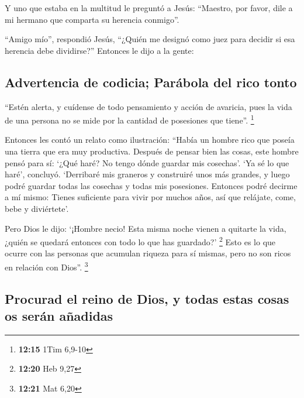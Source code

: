  Y uno que estaba en la multitud le preguntó a Jesús:
``Maestro, por favor, dile a mi hermano que comparta su herencia
conmigo''.

 ``Amigo mío'', respondió Jesús, ``¿Quién me designó como
juez para decidir si esa herencia debe dividirse?'' Entonces le dijo a
la gente:

\hypertarget{advertencia-de-codicia-paruxe1bola-del-rico-tonto}{%
\subsection{Advertencia de codicia; Parábola del rico
tonto}\label{advertencia-de-codicia-paruxe1bola-del-rico-tonto}}

 ``Estén alerta, y cuídense de todo pensamiento y acción
de avaricia, pues la vida de una persona no se mide por la cantidad de
posesiones que tiene''. \footnote{\textbf{12:15} 1Tim 6,9-10}

 Entonces les contó un relato como ilustración: ``Había
un hombre rico que poseía una tierra que era muy productiva.
 Después de pensar bien las cosas, este hombre pensó para
sí: `¿Qué haré? No tengo dónde guardar mis cosechas'. 
`Ya sé lo que haré', concluyó. `Derribaré mis graneros y construiré unos
más grandes, y luego podré guardar todas las cosechas y todas mis
posesiones.  Entonces podré decirme a mí mismo: Tienes
suficiente para vivir por muchos años, así que relájate, come, bebe y
diviértete'.

 Pero Dios le dijo: `¡Hombre necio! Esta misma noche
vienen a quitarte la vida, ¿quién se quedará entonces con todo lo que
has guardado?' \footnote{\textbf{12:20} Heb 9,27}  Esto
es lo que ocurre con las personas que acumulan riqueza para sí mismas,
pero no son ricos en relación con Dios''. \footnote{\textbf{12:21} Mat
  6,20}

\hypertarget{procurad-el-reino-de-dios-y-todas-estas-cosas-os-seruxe1n-auxf1adidas}{%
\subsection{Procurad el reino de Dios, y todas estas cosas os serán
añadidas}\label{procurad-el-reino-de-dios-y-todas-estas-cosas-os-seruxe1n-auxf1adidas}}

